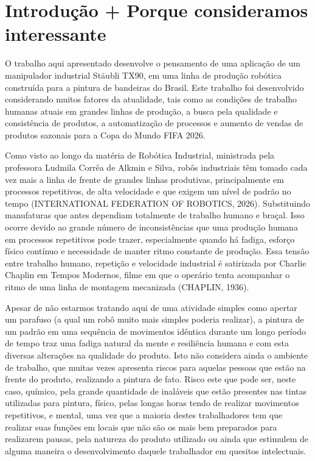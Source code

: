 \section{Introdução + Porque consideramos interessante}

O trabalho aqui apresentado desenvolve o pensamento de uma aplicação de um manipulador industrial Stäubli TX90, em uma linha de produção robótica construída para a pintura de bandeiras do Brasil. Este trabalho foi desenvolvido considerando muitos fatores da atualidade, tais como as condições de trabalho humanas atuais em grandes linhas de produção, a busca pela qualidade e consistência de produtos, a automatização de processos e aumento de vendas de produtos sazonais para a Copa do Mundo FIFA 2026.

Como visto ao longo da matéria de Robótica Industrial, ministrada pela professora Ludmila Corrêa de Alkmin e Silva, robôs industriais têm tomado cada vez mais a linha de frente de grandes linhas produtivas, principalmente em processos repetitivos, de alta velocidade e que exigem um nível de padrão no tempo (INTERNATIONAL FEDERATION OF ROBOTICS, 2026). Substituindo manufaturas que antes dependiam totalmente de trabalho humano e braçal. Isso ocorre devido ao grande número de inconsistências que uma produção humana em processos repetitivos pode trazer, especialmente quando há fadiga, esforço físico contínuo e necessidade de manter ritmo constante de produção. Essa tensão entre trabalho humano, repetição e velocidade industrial é satirizada por Charlie Chaplin em Tempos Modernos, filme em que o operário tenta acompanhar o ritmo de uma linha de montagem mecanizada (CHAPLIN, 1936). 

Apesar de não estarmos tratando aqui de uma atividade simples como apertar um parafuso (a qual um robô muito mais simples poderia realizar), a pintura de um padrão em uma sequência de movimentos idêntica durante um longo período de tempo traz uma fadiga natural da mente e resiliência humana e com esta diversas alterações na qualidade do produto. Isto não considera ainda o ambiente de trabalho, que muitas vezes apresenta riscos para aquelas pessoas que estão na frente do produto, realizando a pintura de fato. Risco este que pode ser, neste caso, químico, pela grande quantidade de inaláveis que estão presentes nas tintas utilizadas para pintura, físico, pelas longas horas tendo de realizar movimentos repetitivos, e mental, uma vez que a maioria destes trabalhadores tem que realizar suas funções em locais que não são os mais bem preparados para realizarem pausas, pela natureza do produto utilizado ou ainda que estimulem de alguma maneira o desenvolvimento daquele trabalhador em quesitos intelectuais.

